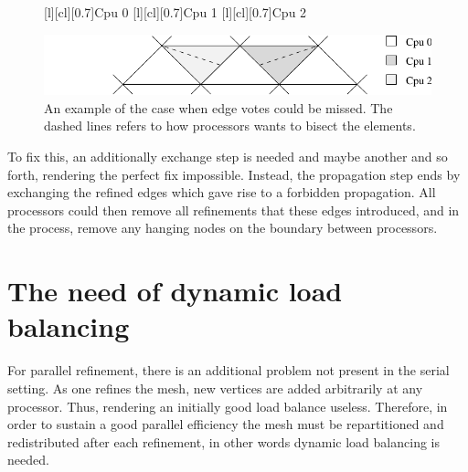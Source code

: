 \begin{figure}[htb]
 [l][cl][0.7]{Cpu 0}
 [l][cl][0.7]{Cpu 1}
 [l][cl][0.7]{Cpu 2}
  \begin{center}
   \includegraphics[width=0.65\columnwidth]{chapters/hoffman-4/pdf/probmissing.pdf}
  \end{center}
   \caption{An example of the case when edge votes could be missed. The dashed lines refers to how processors wants to bisect the elements.}
   \label{hoffman-4:fig:probmissing}

\end{figure}

To fix this, an additionally exchange step is needed and maybe another
and so forth, rendering the perfect fix impossible. Instead, the
propagation step ends by exchanging the refined edges which gave rise
to a forbidden propagation. All processors could then remove all
refinements that these edges introduced, and in the process, remove
any hanging nodes on the boundary between processors.

\section{The need of dynamic load balancing}

For parallel refinement, there is an additional problem not present in
the serial setting. As one refines the mesh, new vertices are added
arbitrarily at any processor. Thus, rendering an initially good load
balance useless. Therefore, in order to sustain a good parallel
efficiency the mesh must be repartitioned and redistributed after each
refinement, in other words dynamic load balancing is needed.

